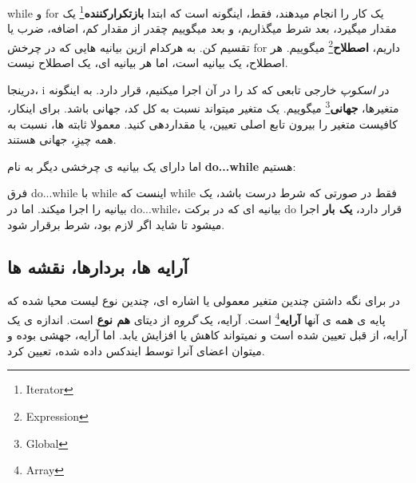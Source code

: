 \documentclass[14pt,a4paper]{memoir}
\begin{document}
while و for یک کار را انجام میدهند، فقط، اینگونه است که ابتدا \textbf{بازتکرارکننده}\footnote{Iterator} یک مقدار میگیرد، بعد شرط میگذاریم، و بعد میگوییم چقدر از مقدار کم، اضافه، ضرب یا تقسیم کن. به هرکدام ازین بیانیه هایی که در چرخش for داریم، \textbf{اصطلاح}\footnote{Expression} میگوییم. هر اصطلاح، یک بیانیه است، اما هر بیانیه ای، یک اصطلاح نیست.

\begin{tip}
	درینجا، i در \textit{اسکوپ} خارجی تابعی که کد را در آن اجرا میکنیم، قرار دارد. به اینگونه متغیرها، \textbf{جهانی}\footnote{Global} میگوییم. یک متغیر میتواند نسبت به کل کد، جهانی باشد. برای اینکار، کافیست متغیر را بیرون تابع اصلی تعیین، یا مقداردهی کنید. معمولا ثابته ها، نسبت به همه چیزِ، جهانی هستند.
\end{tip}
	 اما  دارای یک بیانیه ی چرخشی دیگر به نام  \textbf{do...while} هستیم:
	 
	 	 
	 \begin{latin}
	 	
	 \end{latin}
	 
	 
فرق do...while با while اینست که while فقط در صورتی که شرط درست باشد، یک بیانیه را اجرا میکند. اما در do...while، بیانیه ای که در برکت do قرار دارد، \textbf{یک بار} اجرا میشود تا شاید اگر لازم بود، شرط برقرار شود.


\subsection{آرایه ها، بردارها، نقشه ها}\label{cpparr}
	 
	 در  برای نگه داشتن چندین متغیر معمولی یا اشاره ای، چندین نوع لیست محیا شده که پایه ی همه ی آنها \textbf{آرایه}\footnote{Array} است. آرایه، یک \textit{گروه} از دیتای \textbf{هم نوع} است. اندازه ی یک آرایه، از قبل تعیین شده است و نمیتواند کاهش یا افزایش یابد. اما آرایه، جهشی بوده و میتوان اعضای آنرا توسط ایندکس داده شده، تعیین کرد.
	 
	 
	 
	 
	 	 	 
	 \begin{latin}
	 	
	 \end{latin}
	 
\end{document}

